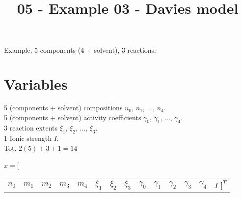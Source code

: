 \documentclass[onecolumn]{article}
\begin{document}
\title{05 - Example 03 - Davies model}
\author{}
\date{}
\maketitle
Example, 5 components (4 + solvent), 3 reactions: \\
\section{Variables}
5 (components + solvent) compositions $n_0$, $n_1$, ..., $n_4$. \\
5 (components + solvent) activity coefficients
$\gamma_0$, $\gamma_1$, ..., $\gamma_4$. \\
3 reaction extents $\xi_1$, $\xi_2$, ..., $\xi_{3}$. \\
1 Ionic strength $I$. \\
Tot. $2(5) + 3 + 1 = 14$ \\
\\
$x =[$
\begin{tabular}{cccccccccccccc}
$n_0$ & $m_1$ & $m_2$ & $m_3$ & $m_4$ & $\xi_1$ & $\xi_2$ & $\xi_3$ &
$\gamma_0$ & $\gamma_1$ & $\gamma_2$ & $\gamma_3$ & $\gamma_4$ & $I$
$]^T$
\end{tabular}
\end{document}
